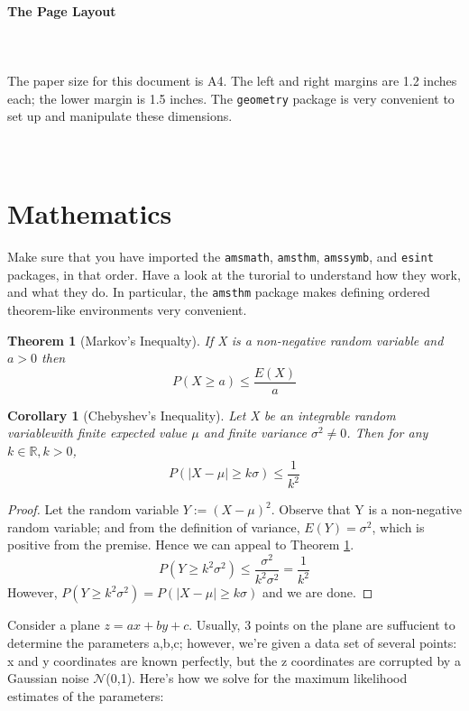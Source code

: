 \documentclass[a4paper]{article}
\newcommand{\R}{\mathbb{R}}
\newtheorem{theorem}{Theorem}
\newtheorem{corollary}{Corollary}
\begin{document}
\paragraph{The Page Layout}\mbox{}\\\mbox{}\\
The paper size for this document is A4. The left and right margins are 1.2 inches each; the lower margin is 1.5 inches. The \texttt{geometry} package is very convenient to set up and manipulate these dimensions.\mbox{}\\\mbox{}\\\mbox{}\\
\section{Mathematics}
Make sure that you have imported the \texttt{amsmath}, \texttt{amsthm}, \texttt{amssymb}, and \texttt{esint} packages, in that order. Have a look at the turorial to understand how they work, and what they do. In particular, the \texttt{amsthm} package makes defining ordered theorem-like environments very convenient.\par
\begin{theorem}[Markov's Inequalty]
\label{theorem1}
If X is a non-negative random variable and $a>0$ then
\[P(X\geq a)\leq \frac{E(X)}{a}\]
\end{theorem}
\begin{corollary}[Chebyshev's Inequality]
\label{corollary2}
Let X be an integrable random variablewith finite expected value $\mu$ and finite variance $\sigma^2 \neq 0$. Then for any $k\in\R,k>0$,
\[P(\mid X-\mu \mid \geq k\sigma)\leq \frac{1}{k^2}\]
\end{corollary}
\begin{proof}
Let the random variable $Y := (X-\mu)^2$. Observe that Y is a non-negative random variable; and from the definition of variance, $E(Y)=\sigma^2$, which is positive from the premise. Hence we can appeal to Theorem \hyperref[theorem1]{1}.
\[P(Y\geq k^2\sigma^2)\leq \frac{\sigma^2}{k^2\sigma^2}=\frac{1}{k^2}\]
However, $P(Y\geq k^2\sigma^2)=P(\mid X-\mu \mid\geq k\sigma)$ and we are done.
\end{proof}
Consider a plane $z=ax+by+c$. Usually, 3 points on the plane are suffucient to determine the parameters a,b,c; however, we're given a data set of several points: x and y coordinates are known perfectly, but the z coordinates are corrupted by a Gaussian noise $\mathcal{N}$(0,1). Here's how we solve for the maximum likelihood estimates of the parameters:
\end{document}
